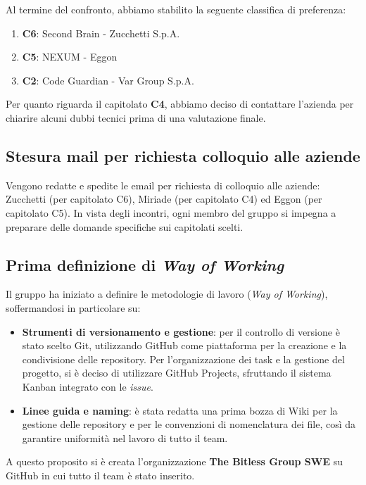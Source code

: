 \documentclass[a4paper, 10pt, colorlinks=true, linkcolor=black, urlcolor=blue, citecolor=blue, hidelinks]{article}
\begin{document}
Al termine del confronto, abbiamo stabilito la seguente classifica di preferenza:
\begin{enumerate}
    \item \textbf{C6}: Second Brain - Zucchetti S.p.A.
    \item \textbf{C5}: NEXUM - Eggon
    \item \textbf{C2}: Code Guardian - Var Group S.p.A.
\end{enumerate}
Per quanto riguarda il capitolato \textbf{C4}, abbiamo deciso di contattare l'azienda per chiarire alcuni dubbi tecnici prima di una valutazione finale.

\subsection{Stesura mail per richiesta colloquio alle aziende}
Vengono redatte e spedite le email per richiesta di colloquio alle aziende: Zucchetti (per capitolato C6), Miriade (per capitolato C4) ed Eggon (per capitolato C5). In vista degli incontri, ogni membro del gruppo si impegna a preparare delle domande specifiche sui capitolati scelti.

\subsection{Prima definizione di \textit{Way of Working}}
Il gruppo ha iniziato a definire le metodologie di lavoro (\textit{Way of Working}), soffermandosi in particolare su:
\begin{itemize}
    \item \textbf{Strumenti di versionamento e gestione}: per il controllo di versione è stato scelto Git, utilizzando GitHub come piattaforma per la creazione e la condivisione delle repository. Per l'organizzazione dei task e la gestione del progetto, si è deciso di utilizzare GitHub Projects, sfruttando il sistema Kanban integrato con le \textit{issue}.
    \item \textbf{Linee guida e naming}: è stata redatta una prima bozza di Wiki per la gestione delle repository e per le convenzioni di nomenclatura dei file, così da garantire uniformità nel lavoro di tutto il team.
\end{itemize}

A questo proposito si è creata l'organizzazione \textbf{The Bitless Group SWE} su GitHub in cui tutto il team è stato inserito.
\end{document}
